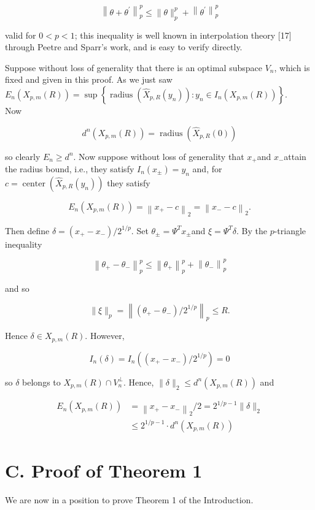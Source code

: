 \documentclass[10pt]{article}
\begin{document}
$$
\left\|\theta+\theta^{\prime}\right\|_{p}^{p} \leq\|\theta\|_{p}^{p}+\left\|\theta^{\prime}\right\|_{p}^{p}
$$

valid for $0<p<1$; this inequality is well known in interpolation theory [17] through Peetre and Sparr's work, and is easy to verify directly.

Suppose without loss of generality that there is an optimal subspace $V_{n}$, which is fixed and given in this proof. As we just saw\\
$E_{n}\left(X_{p, m}(R)\right)=\sup \left\{\operatorname{radius}\left(\hat{X}_{p, R}\left(y_{n}\right)\right): y_{n} \in I_{n}\left(X_{p, m}(R)\right)\right\}$.\\
Now

$$
d^{n}\left(X_{p, m}(R)\right)=\operatorname{radius}\left(\hat{X}_{p, R}(0)\right)
$$

so clearly $E_{n} \geq d^{n}$. Now suppose without loss of generality that $x_{+}$and $x_{-}$attain the radius bound, i.e., they satisfy $I_{n}\left(x_{ \pm}\right)= y_{n}$ and, for $c=\operatorname{center}\left(\hat{X}_{p, R}\left(y_{n}\right)\right)$ they satisfy

$$
E_{n}\left(X_{p, m}(R)\right)=\left\|x_{+}-c\right\|_{2}=\left\|x_{-}-c\right\|_{2} .
$$

Then define $\delta=\left(x_{+}-x_{-}\right) / 2^{1 / p}$. Set $\theta_{ \pm}=\Psi^{T} x_{ \pm}$and $\xi= \Psi^{T} \delta$. By the $p$-triangle inequality

$$
\left\|\theta_{+}-\theta_{-}\right\|_{p}^{p} \leq\left\|\theta_{+}\right\|_{p}^{p}+\left\|\theta_{-}\right\|_{p}^{p}
$$

and so

$$
\|\xi\|_{p}=\left\|\left(\theta_{+}-\theta_{-}\right) / 2^{1 / p}\right\|_{p} \leq R .
$$

Hence $\delta \in X_{p, m}(R)$. However,

$$
I_{n}(\delta)=I_{n}\left(\left(x_{+}-x_{-}\right) / 2^{1 / p}\right)=0
$$

so $\delta$ belongs to $X_{p, m}(R) \cap V_{n}^{\perp}$. Hence, $\|\delta\|_{2} \leq d^{n}\left(X_{p, m}(R)\right)$ and

$$
\begin{aligned}
E_{n}\left(X_{p, m}(R)\right) & =\left\|x_{+}-x_{-}\right\|_{2} / 2=2^{1 / p-1}\|\delta\|_{2} \\
& \leq 2^{1 / p-1} \cdot d^{n}\left(X_{p, m}(R)\right)
\end{aligned}
$$

\section*{C. Proof of Theorem 1}
We are now in a position to prove Theorem 1 of the Introduction.
\end{document}
